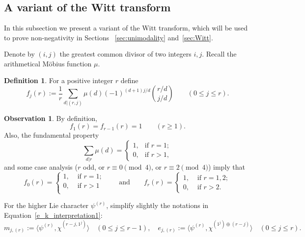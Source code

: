 \documentclass[10pt]{article}
\theoremstyle{definition}
\newtheorem{definition}[theorem]{Definition}
\newtheorem{observation}[cdrthm]{Observation}
\begin{document}
\subsection{A variant of the Witt transform}
\label{sec:Witt-subsec}
 
In this subsection we present a variant of the Witt transform, which will be used to prove non-negativity in Sections ~\ref{sec:unimodality} and~\ref{sec:Witt}.
    
Denote by $(i,j)$ the greatest common divisor of two integers $i,j$. Recall the arithmetical M\"obius function $\mu$. 
    
\begin{definition}\label{def:f}
    For a positive integer $r$ define 
    \[
        f_j(r) 
        := \frac{1}{r} \sum_{d|(r,j)} \mu(d)(-1)^{(d+1)j/d} \binom{r/d}{j/d} 
	   \qquad (0\le j\le r). 
    \]
\end{definition}
   
\begin{observation}\label{obs:f_values}
    By definition, 
    \[
        f_1(r) = f_{r-1}(r) = 1
        \qquad (r \ge 1).
    \]
    Also, the fundamental property
    \[
        \sum_{d|r} \mu(d) = 
        \begin{cases}
            1, &\text{if } r=1; \\
            0, &\text{if } r>1,
        \end{cases}
    \]
    and some case analysis ($r$ odd, or $r \equiv 0 \pmod 4$, or $r \equiv 2 \pmod 4$) imply that
    \[
        f_0(r) = 
        \begin{cases} 
            1,&\text{ if }  r=1;\\
            0,&\text{ if } r>1\\
        \end{cases}
        \qquad \text{and} \qquad
        f_r(r) = 
        \begin{cases} 
            1,&\text{ if }  r=1,2;\\
            0,&\text{ if } r>2.
        \end{cases}
    \]
\end{observation}
      
For the higher Lie character $\psi^{(r)}$, 
simplify slightly the notations in Equation~\eqref{e_k_interpretation1}:
\[
    m_{j,(r)}
    := \langle \psi^{(r)},\chi^{(r-j,1^j)} \rangle 
    \quad (0 \le j \le r-1), \quad
    e_{j,(r)} 
    :=\langle \psi^{(r)},\chi^{(1^j)\oplus(r-j)} \rangle
    \quad (0 \le j \le r).
\]
\end{document}
